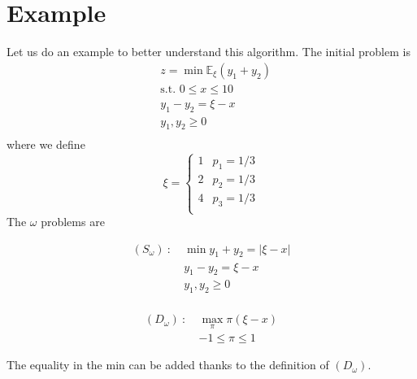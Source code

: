 \documentclass[12pt, openany]{report}
\newcommand{\E}{\mathbb{E}}
\theoremstyle{definition}
\begin{document}
\section{Example}\label{sec:lshaped_example}
Let us do an example to better understand this algorithm. The initial problem is 
\begin{equation}
	\begin{aligned}
		&z = \min\E_\xi(y_1 + y_2)\\
		& \text{s.t. }0\le x\le 10\\
		& y_1-y_2 = \xi-x\\
		& y_1,y_2\ge 0\\
	\end{aligned}
\end{equation}
where we define 
\begin{equation}
	\xi = \begin{cases}
		1 & p_1 = 1/3\\
		2 & p_2 = 1/3\\
		4 & p_3 = 1/3\\
	\end{cases}
\end{equation}
The $\omega$ problems are \\
\begin{minipage}{.5\textwidth}
	\begin{equation}
		\begin{aligned}
			(S_\omega)\ : \ &\min y_1 + y_2 = |\xi-x|\\
			& y_1 - y_2 = \xi - x\\
			& y_1,y_2 \ge 0\\
		\end{aligned}
	\end{equation}
\end{minipage}
\begin{minipage}{.5\textwidth}
	\begin{equation}
		\begin{aligned}
			(D_\omega) \ : \ & \max_\pi \pi(\xi-x)\\
			&-1\le \pi\le 1
		\end{aligned}
	\end{equation}
\end{minipage}
The equality in the min can be added thanks to the definition of $(D_\omega)$.
\end{document}

